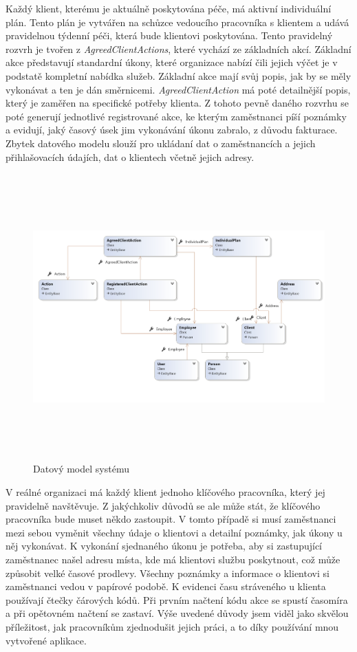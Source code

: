 \documentclass[
  glossaries,
]{kidiplom}
\begin{document}
Každý klient, kterému je aktuálně poskytována péče, má aktivní individuální plán. Tento plán je vytvářen na schůzce vedoucího pracovníka s klientem a udává pravidelnou týdenní péči, která bude klientovi poskytována. Tento pravidelný rozvrh je tvořen z \textit{AgreedClientActions}, které vychází ze základních akcí. Základní akce představují  standardní úkony, které organizace nabízí čili jejich výčet je v podstatě kompletní nabídka služeb. Základní akce mají svůj popis, jak by se měly vykonávat a ten je dán směrnicemi. \textit{AgreedClientAction} má poté detailnější popis, který je zaměřen na specifické potřeby klienta. Z tohoto pevně daného rozvrhu se poté generují jednotlivé registrované akce, ke kterým zaměstnanci píší poznámky a evidují, jaký časový úsek jim vykonávání úkonu zabralo, z důvodu fakturace. Zbytek datového modelu slouží pro ukládaní dat o zaměstnancích a jejich přihlašovacích údajích, dat o klientech včetně jejich adresy. 

\begin{figure}[H]
  	\centering
 	 \includegraphics[width=14cm,height=11cm]{datamodel}
 	 \caption{Datový model systému}
 	 \label{fig:dataModel}
\end{figure}

 V reálné organizaci má každý klient jednoho klíčového pracovníka, který jej pravidelně navštěvuje. Z jakýchkoliv důvodů se ale může stát, že klíčového pracovníka bude muset někdo zastoupit. V tomto případě si musí zaměstnanci mezi sebou vyměnit všechny údaje o klientovi a detailní poznámky, jak úkony u něj vykonávat. K vykonání sjednaného úkonu je potřeba, aby si zastupující zaměstnanec našel adresu místa, kde má klientovi službu poskytnout, což může způsobit velké časové prodlevy. Všechny poznámky a informace o klientovi si zaměstnanci vedou v papírové podobě. K evidenci času stráveného u klienta používají čtečky čárových kódů. Při prvním načtení kódu akce se spustí časomíra a při opětovném načtení se zastaví. Výše uvedené důvody jsem viděl jako skvělou příležitost, jak pracovníkům zjednodušit jejich práci, a to díky používání mnou vytvořené aplikace. 
\newpage
\end{document}
